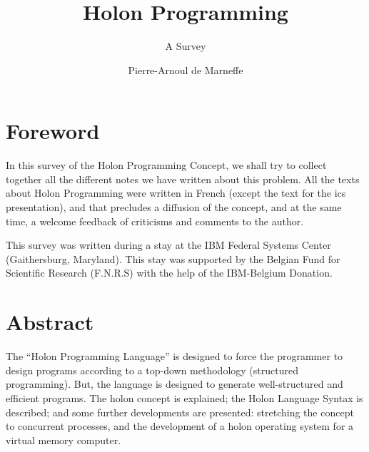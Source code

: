 \documentclass[openany,nobib]{tufte-book}
\title{Holon Programming}
\subtitle{A Survey}
\author{Pierre-Arnoul de Marneffe}
\begin{document}
\frontmatter



\maketitle

\chapter*{Foreword}

In this survey of the Holon Programming Concept,
we shall try to collect together all the different
notes we have written about this problem. All the
texts about Holon Programming were written in French\autocite{marneffe1972}
(except the text for the {\sc ics} presentation)\autocite{marneffe1973}, and
that precludes a diffusion of the concept, and at the
same time, a welcome feedback of criticisms and
comments to the author.

This survey was written during a stay at the IBM Federal
Systems Center (Gaithersburg, Maryland). This stay was
supported by the Belgian Fund for Scientific Research
(F.N.R.S) with the help of the IBM-Belgium Donation.
\clearpage

\begingroup
\let\clearpage\relax
\let\cleardoublepage\relax
\let\cleardoublepage\relax

\chapter*{Abstract}
The ``Holon Programming Language'' is designed to force
the programmer to design programs according to a
top-down methodology (structured programming). But, the
language is designed to generate well-structured and
efficient programs. The holon concept is explained; the
Holon Language Syntax is described; and some further
developments are presented: stretching the concept to
concurrent processes, and the development of a holon
operating system for a virtual memory computer.

\endgroup

\vfill


\tableofcontents

\listoffigures
\end{document}
